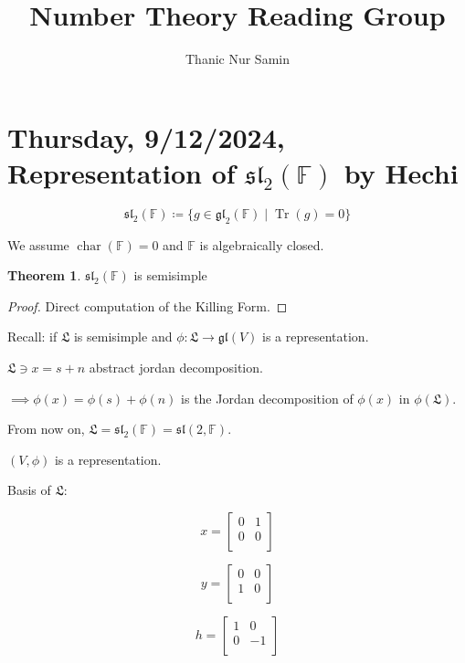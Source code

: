 \documentclass{article}
\title{Number Theory Reading Group}
\author{Thanic Nur Samin}
\date{\vspace{-5ex}}
\theoremstyle{definition}
\newtheorem{theorem}{Theorem}[section]
\newcommand{\Char}{\operatorname{char}}
\newcommand{\Tr}{\operatorname{Tr}}
\begin{document}
\maketitle

\tableofcontents

\section{Thursday, 9/12/2024, Representation of \(\mathfrak{sl}_2(\mathbb{F})\) by Hechi}

\[
    \mathfrak{sl}_2(\mathbb{F}) \coloneqq \{ g \in \mathfrak{gl}_2(\mathbb{F}) \mid \Tr(g) = 0 \}
\]

We assume \(\Char(\mathbb{F}) = 0\) and \(\mathbb{F}\) is algebraically closed.

\begin{theorem}
    \(\mathfrak{sl}_2(\mathbb{F})\) is semisimple
\end{theorem}

\begin{proof}
    Direct computation of the Killing Form.
\end{proof}

Recall: if \(\mathfrak{L}\) is semisimple and \(\phi: \mathfrak{L}  \to \mathfrak{gl}(V)\) is a representation.

\(\mathfrak{L} \ni x = s+n\) abstract jordan decomposition.

\(\implies \phi(x) = \phi(s) + \phi(n)\) is the Jordan decomposition of \(\phi(x)\) in \(\phi(\mathfrak{L})\).

From now on, \(\mathfrak{L} = \mathfrak{sl}_2(\mathbb{F}) = \mathfrak{sl}(2,\mathbb{F})\).

\((V,\phi)\) is a representation.

Basis of \(\mathfrak{L}\):

\[
    x = \begin{bmatrix}
        0 &  1 \\
        0 &  0 \\
    \end{bmatrix}
\]

\[
    y = \begin{bmatrix}
        0 &  0 \\
        1 &  0 \\
    \end{bmatrix}
\]

\[
    h = \begin{bmatrix}
        1 &  0 \\
        0 &  -1 \\
    \end{bmatrix}
\]
\end{document}
